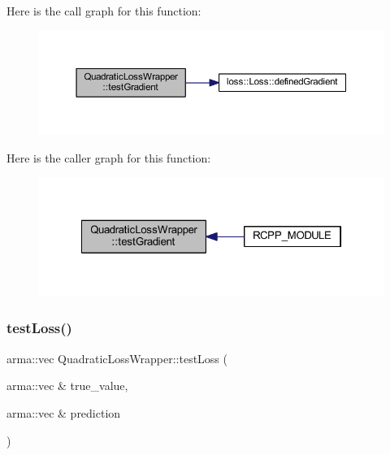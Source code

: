 Here is the call graph for this function\+:\nopagebreak
\begin{figure}[H]
\begin{center}
\leavevmode
\includegraphics[width=350pt]{class_quadratic_loss_wrapper_a9154647dbe336faf38e0fdfb3f30173d_cgraph}
\end{center}
\end{figure}
Here is the caller graph for this function\+:\nopagebreak
\begin{figure}[H]
\begin{center}
\leavevmode
\includegraphics[width=322pt]{class_quadratic_loss_wrapper_a9154647dbe336faf38e0fdfb3f30173d_icgraph}
\end{center}
\end{figure}
\mbox{\label{class_quadratic_loss_wrapper_a9e179437d5d6cffc4e2eb41cf46a2666}} 
\subsubsection{\texorpdfstring{test\+Loss()}{testLoss()}}
{\footnotesize\ttfamily arma\+::vec Quadratic\+Loss\+Wrapper\+::test\+Loss (\begin{DoxyParamCaption}\item[{arma\+::vec \&}]{true\+\_\+value,  }\item[{arma\+::vec \&}]{prediction }\end{DoxyParamCaption})\hspace{0.3cm}{\ttfamily [inline]}}

